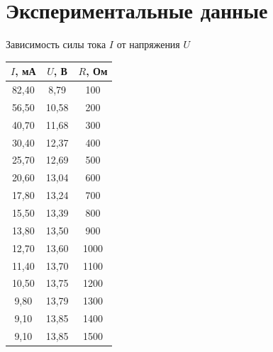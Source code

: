 \documentclass[12pt]{article}
\begin{document}
\section*{Экспериментальные данные}
\begin{table}[h!]
\begin{center}
Зависимость силы тока $I$ от напряжения $U$

\begin{tabular}{|c|c|c|}
\hline
$I$, мА & $U$, В & $R$, Ом \\
\hline
82,40 & 8,79 & 100\\
\hline
56,50 & 10,58 & 200\\
\hline
40,70 & 11,68 & 300\\
\hline
30,40 & 12,37 & 400\\
\hline
25,70 & 12,69 & 500\\
\hline
20,60 & 13,04 & 600\\
\hline
17,80 & 13,24 & 700\\
\hline
15,50 & 13,39 & 800\\
\hline
13,80 & 13,50 & 900\\
\hline
12,70 & 13,60 & 1000\\
\hline
11,40 & 13,70 & 1100\\
\hline
10,50 & 13,75 & 1200\\
\hline
9,80 & 13,79 & 1300\\
\hline
9,10 & 13,85 & 1400\\
\hline
9,10 & 13,85 & 1500\\
\hline
\end{tabular}
\end{center}
\end{table}
\newpage
\end{document}
